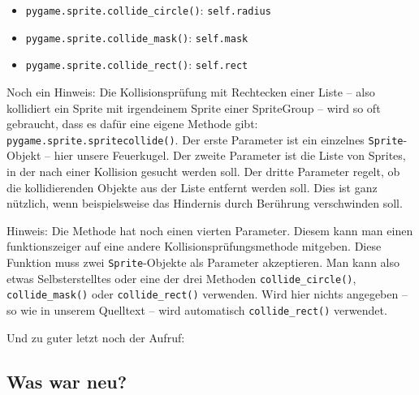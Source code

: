 \begin{itemize}
    \item \texttt{pygame.sprite.collide\_circle()}: \texttt{self.radius}
    \item \texttt{pygame.sprite.collide\_mask()}: \texttt{self.mask}
    \item \texttt{pygame.sprite.collide\_rect()}: \texttt{self.rect}
\end{itemize}


Noch ein Hinweis: Die Kollisionsprüfung mit Rechtecken einer Liste -- also kollidiert ein Sprite mit irgendeinem Sprite einer SpriteGroup -- wird so oft gebraucht, dass es dafür eine eigene Methode gibt: \texttt{pygame.sprite.spritecollide()}. Der erste Parameter ist ein einzelnes \texttt{Sprite}-Objekt -- hier unsere Feuerkugel. Der zweite Parameter ist die Liste von Sprites, in der nach einer Kollision gesucht werden soll. Der dritte Parameter regelt, ob die kollidierenden Objekte aus der Liste entfernt werden soll. Dies ist ganz nützlich, wenn beispielsweise das Hindernis durch Berührung verschwinden soll. 

Hinweis: Die Methode hat noch einen vierten Parameter. Diesem kann man einen \Gls{funktionszeiger} auf eine andere Kollisionsprüfungsmethode mitgeben. Diese Funktion muss zwei \texttt{Sprite}-Objekte als Parameter akzeptieren. Man kann also etwas Selbsterstelltes oder eine der drei Methoden \texttt{collide\_circle()}, \texttt{collide\_mask()} oder \texttt{collide\_rect()} verwenden. Wird hier nichts angegeben -- so wie in unserem Quelltext -- wird automatisch \texttt{collide\_rect()} verwendet.


Und zu guter letzt noch der Aufruf:



\subsection*{Was war neu?}

